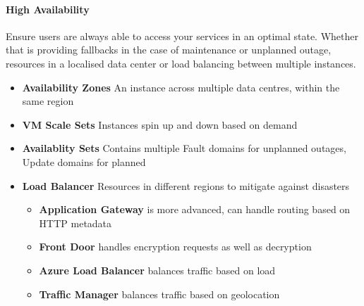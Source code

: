 \documentclass[a4paper,14pt]{report}
\begin{document}
\paragraph{High Availability}
Ensure users are always able to access your services in an optimal state. Whether that is providing fallbacks in the
case of maintenance or unplanned outage, resources in a localised data center or load balancing between multiple instances.
\\
\begin{itemize}
    \item \textbf{Availability Zones} An instance across multiple data centres, within the same region
    \item \textbf{VM Scale Sets} Instances spin up and down based on demand
    \item \textbf{Availablity Sets} Contains multiple Fault domains for unplanned outages, Update domains for planned
    \item \textbf{Load Balancer} Resources in different regions to mitigate against disasters
    \begin{itemize}
        \item \textbf{Application Gateway} is more advanced, can handle routing based on HTTP metadata
        \item \textbf{Front Door} handles encryption requests as well as decryption
        \item \textbf{Azure Load Balancer} balances traffic based on load
        \item \textbf{Traffic Manager} balances traffic based on geolocation
    \end{itemize}
\end{itemize}
\end{document}
